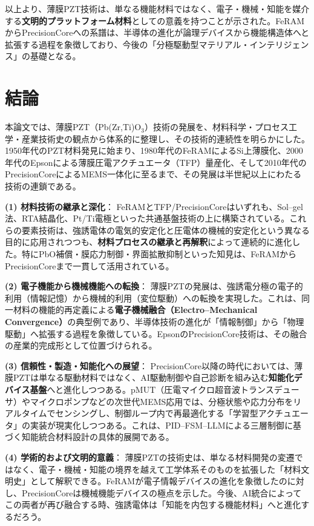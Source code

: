 \documentclass[conference]{IEEEtran}
\begin{document}
\medskip
以上より、薄膜PZT技術は、単なる機能材料ではなく、電子・機械・知能を媒介する\textbf{文明的プラットフォーム材料}としての意義を持つことが示された。FeRAMからPrecisionCoreへの系譜は、半導体の進化が論理デバイスから機能構造体へと拡張する過程を象徴しており、今後の「分極駆動型マテリアル・インテリジェンス」の基礎となる。

\section{結論}
本論文では、薄膜PZT（Pb(Zr,Ti)O$_3$）技術の発展を、材料科学・プロセス工学・産業技術史の観点から体系的に整理し、その技術的連続性を明らかにした。1950年代のPZT材料発見に始まり、1980年代のFeRAMによるSi上薄膜化、2000年代のEpsonによる薄膜圧電アクチュエータ（TFP）量産化、そして2010年代のPrecisionCoreによるMEMS一体化に至るまで、その発展は半世紀以上にわたる技術の連鎖である。

\medskip
\noindent
\textbf{(1) 材料技術の継承と深化}：
FeRAMとTFP/PrecisionCoreはいずれも、Sol--gel法、RTA結晶化、Pt/Ti電極といった共通基盤技術の上に構築されている。これらの要素技術は、強誘電体の電気的安定化と圧電体の機械的安定化という異なる目的に応用されつつも、\textbf{材料プロセスの継承と再解釈}によって連続的に進化した。特にPbO補償・膜応力制御・界面拡散抑制といった知見は、FeRAMからPrecisionCoreまで一貫して活用されている。

\medskip
\noindent
\textbf{(2) 電子機能から機械機能への転換}：
薄膜PZTの発展は、強誘電分極の電子的利用（情報記憶）から機械的利用（変位駆動）への転換を実現した。これは、同一材料の機能的再定義による\textbf{電子機械融合（Electro–Mechanical Convergence）}の典型例であり、半導体技術の進化が「情報制御」から「物理駆動」へ拡張する過程を象徴している。EpsonのPrecisionCore技術は、その融合の産業的完成形として位置づけられる。

\medskip
\noindent
\textbf{(3) 信頼性・製造・知能化への展望}：
PrecisionCore以降の時代においては、薄膜PZTは単なる駆動材料ではなく、AI駆動制御や自己診断を組み込む\textbf{知能化デバイス基盤}へと進化しつつある。pMUT（圧電マイクロ超音波トランスデューサ）やマイクロポンプなどの次世代MEMS応用では、分極状態や応力分布をリアルタイムでセンシングし、制御ループ内で再最適化する「学習型アクチュエータ」の実装が現実化しつつある。これは、PID--FSM--LLMによる三層制御\cite{samizo2025aitl_architecture}に基づく知能統合材料設計の具体的展開である。

\medskip
\noindent
\textbf{(4) 学術的および文明的意義}：
薄膜PZTの技術史は、単なる材料開発の変遷ではなく、電子・機械・知能の境界を越えて工学体系そのものを拡張した「材料文明史」として解釈できる。FeRAMが電子情報デバイスの進化を象徴したのに対し、PrecisionCoreは機械機能デバイスの極点を示した。今後、AI統合によってこの両者が再び融合する時、強誘電体は「知能を内包する機能材料」へと進化するだろう。
\end{document}
